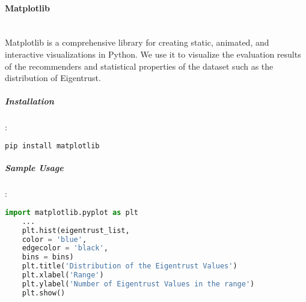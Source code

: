 	\paragraph{Matplotlib \cite{Matplotlib}} \mbox{} \\
	Matplotlib is a comprehensive library for creating static, animated, and interactive visualizations in Python. We use it to visualize the evaluation results of the recommenders and  statistical properties of the dataset such as the distribution of Eigentrust.
	\subparagraph{Installation}:
	\begin{lstlisting}[language=bash]
	pip install matplotlib
	\end{lstlisting}
	
	\subparagraph{Sample Usage}:
	\begin{lstlisting}[language=python, caption=Matplotlib example]
	import matplotlib.pyplot as plt
	...
	plt.hist(eigentrust_list, 
	color = 'blue', 
	edgecolor = 'black',
	bins = bins)
	plt.title('Distribution of the Eigentrust Values')
	plt.xlabel('Range')
	plt.ylabel('Number of Eigentrust Values in the range')
	plt.show() 
	\end{lstlisting}